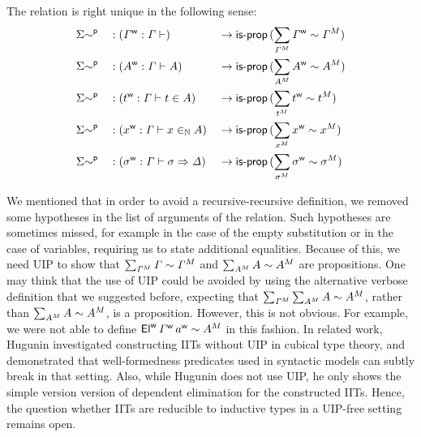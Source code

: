 \begin{lemma}\label{lem:right_uniqueness}
The relation is right unique in the following sense:
  \begin{alignat*}{5}
    &
    {\Sigma{\sim}}^{\mathsf{p}}
    && : ({\mathit{\Gamma}}^{\mathsf{w}} : \mathit{\Gamma} \vdash ) && \rightarrow
    \mathsf{is\text{-}prop}\, (\sum_{{\mathit{\Gamma}}^M} {\mathit{\Gamma}}^{\mathsf{w}} \sim {\mathit{\Gamma}}^M)
    \\
    &
    {\Sigma{\sim}}^{\mathsf{p}}
    && : ({A}^{\mathsf{w}} : \mathit{\Gamma} \vdash A) && \rightarrow
    \mathsf{is\text{-}prop}\, (\sum_{{A}^M} {A}^{\mathsf{w}} \sim {A}^M)
    \\
    &
    {\Sigma{\sim}}^{\mathsf{p}}
    && : ({t}^{\mathsf{w}} : \mathit{\Gamma} \vdash t \in A) && \rightarrow
    \mathsf{is\text{-}prop}\, (\sum_{{t}^M} {t}^{\mathsf{w}} \sim {t}^M)
    \\
    &
    {\Sigma{\sim}}^{\mathsf{p}}
    && : ({x}^{\mathsf{w}} : \mathit{\Gamma} \vdash x \in_{\mathbb{N}} A) && \rightarrow
    \mathsf{is\text{-}prop}\, (\sum_{{x}^M} {x}^{\mathsf{w}} \sim {x}^M)
    \\
    &
    {\Sigma{\sim}}^{\mathsf{p}}
    && : ({\sigma}^{\mathsf{w}} : \mathit{\Gamma} \vdash \sigma \Rightarrow \mathit{\Delta}) && \rightarrow
    \mathsf{is\text{-}prop}\, (\sum_{{\sigma}^M} {\sigma}^{\mathsf{w}} \sim {\sigma}^M)
  \end{alignat*}
\end{lemma}

\begin{remark}
  We mentioned that in order to avoid a recursive-recursive definition, we
  removed some hypotheses in the list of arguments of the relation. Such
  hypotheses are sometimes missed, for example in the case of the empty
  substitution or in the case of variables, requiring us to state additional
  equalities. Because of this, we need UIP to show that
  $\sum_{{\mathit{\Gamma}}^M}\mathit{\Gamma}\sim{\mathit{\Gamma}}^M$ and
  $\sum_{{A}^M}A\sim{A}^M$ are propositions.  One may think that the use
  of UIP could be avoided by using the alternative verbose definition that we
  suggested before, expecting that
  $\sum_{{\mathit{\Gamma}}^M}\sum_{{A}^M}A\sim{A}^M$, rather than
  $\sum_{{A}^M}A\sim{A}^M$, is a proposition.  However, this is not
  obvious. For example, we were not able to define
  ${\mathsf{El}}^{\mathsf{w}}\,{\mathit{\Gamma}}^{\mathsf{w}}\,{a}^{\mathsf{w}}\sim {A}^M$ in this fashion. In related work,
  Hugunin investigated constructing IITs without
  UIP \cite{jasper} in cubical type theory, and demonstrated
  that well-formedness predicates used in syntactic models can subtly break
  in that setting. Also, while Hugunin does not use UIP, he only shows the simple version
  version of dependent elimination for the constructed IITs. Hence, the
  question whether IITs are reducible to inductive types in a UIP-free setting
  remains open.
\end{remark}

